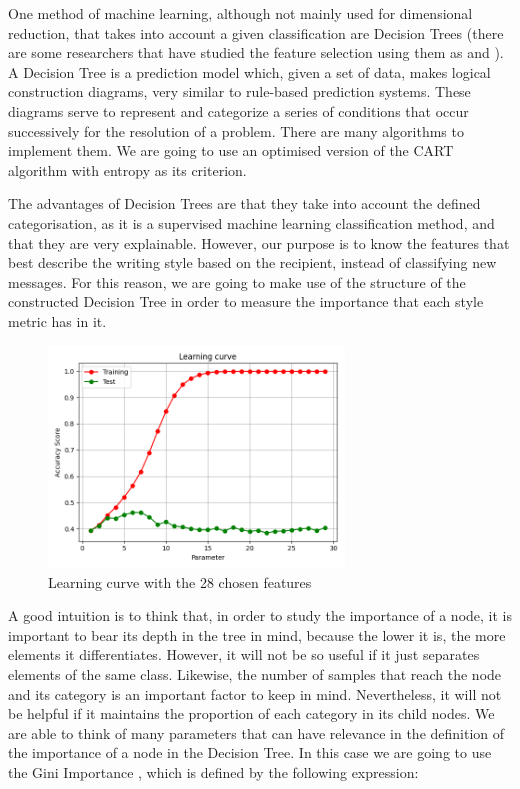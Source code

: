 One method of machine learning, although not mainly used for dimensional reduction, that takes into account a given classification are Decision Trees (there are some researchers that have studied the feature selection using them as \cite{sugumaran2007feature} and \cite{cho2011decision}). A Decision Tree \citep{rokach2008data} is a prediction model which, given a set of data, makes logical construction diagrams, very similar to rule-based prediction systems. These diagrams serve to represent and categorize a series of conditions that occur successively for the resolution of a problem. There are many algorithms to implement them. We are going to use an optimised version of the CART algorithm \citep{breiman1984classification} with entropy as its criterion.

The advantages of Decision Trees are that they take into account the defined categorisation, as it is a supervised machine learning classification method, and that they are very explainable. However, our purpose is to know the features that best describe the writing style based on the recipient, instead of classifying new messages. For this reason, we are going to make use of the structure of the constructed Decision Tree in order to measure the importance that each style metric has in it.

\begin{figure}[h]
	\centering%
	\centerline{\includegraphics[width=0.7\textwidth]{Imagenes/Bitmap/DecisionTrees/learning28curve.png}}%
	\caption{Learning curve with the 28 chosen features}%
	\label{fig:learn28curve}
\end{figure}

A good intuition is to think that, in order to study the importance of a node, it is important to bear its depth in the tree in mind, because the lower it is, the more elements it differentiates. However, it will not be so useful if it just separates elements of the same class. Likewise, the number of samples that reach the node and its category is an important factor to keep in mind. Nevertheless, it will not be helpful if it maintains the proportion of each category in its child nodes. We are able to think of many parameters that can have relevance in the definition of the importance of a node in the Decision Tree. In this case we are going to use the Gini Importance \citep{breiman2001random}, which is defined by the following expression:

